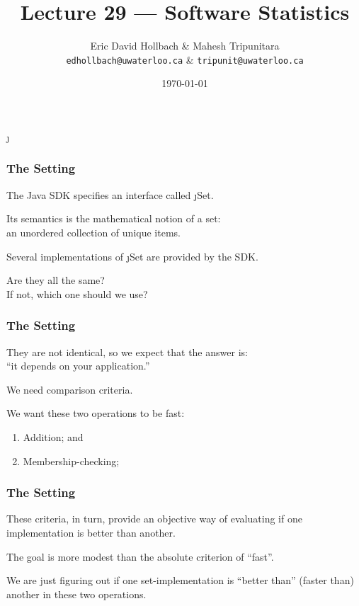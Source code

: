 
\usepackage{tikz-3dplot}
\DeclareUrlCommand\j{}


\title{Lecture 29 --- Software Statistics}

\author{Eric David Hollbach \& Mahesh Tripunitara \\ \small \texttt{edhollbach@uwaterloo.ca} \& \texttt{tripunit@uwaterloo.ca}}
\date{\today}



\begin{frame}
  \titlepage
\end{frame}

\begin{frame}
\frametitle{The Setting}
\begin{changemargin}{1cm}

The Java SDK specifies an interface called \j{Set}. 

Its semantics is the mathematical notion of a set:\\
\quad an unordered collection of unique items.

Several implementations of \j{Set} are provided by the SDK. 

Are they all the same? \\
\quad If not, which one should we use?

\end{changemargin}
\end{frame}

\begin{frame}
\frametitle{The Setting}
\begin{changemargin}{1cm}

They are not identical, so we expect that the answer is: \\
\quad ``it depends on your application.''

We need comparison criteria.

We want these two operations to be fast:
\begin{enumerate}
    \item Addition; and
    \item Membership-checking;
\end{enumerate}

\end{changemargin}
\end{frame}


\begin{frame}
\frametitle{The Setting}
\begin{changemargin}{1cm}

These criteria, in turn, provide an objective way of evaluating if
one implementation is better than another. 

The goal is more modest than the absolute criterion of ``fast''. 

We are just figuring out if one set-implementation
is ``better than'' (faster than) another in these two operations.

\end{changemargin}
\end{frame}

